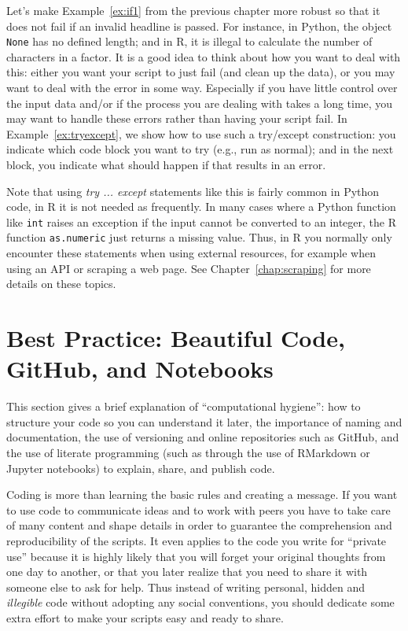 Let's make Example~\ref{ex:if1} from the previous chapter more robust so that it does not fail if an invalid headline is passed. For instance, in Python, the object \verb|None| has no defined length; and in R, it is illegal to calculate the number of characters in a factor. It is a good idea to think about how you want to deal with this: either you want your script to just fail (and clean up the data), or you may want to deal with the error in some way. Especially if you have little control over the input data and/or if the process you are dealing with takes a long time, you may want to  handle these errors rather than having your script fail. In Example~\ref{ex:tryexcept}, we show how to use such a try/except construction: you indicate which code block you want to try (e.g., run as normal); and in the next block, you indicate what should happen if that results in an error.

Note that using \emph{try ... except} statements like this is fairly common in Python code,
in R it is not needed as frequently.
In many cases where a Python function like \verb|int| raises an exception
if the input cannot be converted to an integer, the R function \verb|as.numeric| just returns a missing value.
Thus, in R you normally only encounter these statements when using external resources,
for example when using an API or scraping a web page. See Chapter~\ref{chap:scraping} for more details on these topics.



%

\section{Best Practice: Beautiful Code, GitHub, and Notebooks}
\label{sec:practices}


This section gives a brief explanation of ``computational hygiene'': how to structure your code so you can understand it later, the importance of naming and documentation, the use of versioning and online repositories such as GitHub, and the use of literate programming (such as through the use of RMarkdown or Jupyter notebooks) to explain, share, and publish code.

Coding is more than learning the basic rules and creating a message. If you want to use code to communicate ideas and to work with peers you have to take care of many content and shape details in order to guarantee the comprehension and reproducibility of the scripts. It even applies to the code you write for ``private use'' because it is highly likely that you will  forget your original thoughts from one day to another, or that you later realize that you need to share it with someone else to ask for help. Thus instead of writing personal, hidden and \textit{illegible} code without adopting any social conventions, you should dedicate some extra effort to make your scripts easy and ready to share.

